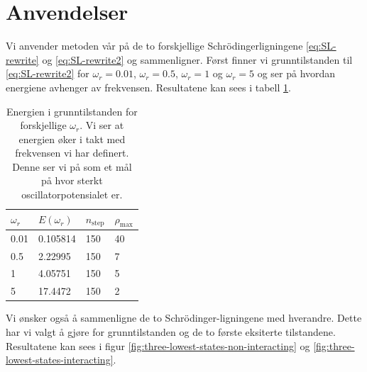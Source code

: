 \documentclass[11pt]{article}
\begin{document}
\section{Anvendelser}
Vi anvender metoden vår på de to forskjellige Schr\"odingerligningene \eqref{eq:SL-rewrite} og \eqref{eq:SL-rewrite2} og sammenligner.
Først finner vi grunntilstanden til \eqref{eq:SL-rewrite2} for $\omega_r = 0.01$, $\omega_r = 0.5$, $\omega_r = 1$ og $\omega_r = 5$ og
ser på hvordan energiene avhenger av frekvensen. Resultatene kan sees i tabell \ref{tab:1}.
\begin{table}[h]
\centering
\caption{Energien i grunntilstanden for forskjellige $\omega_r$. Vi ser at energien
øker i takt med frekvensen vi har definert. Denne ser vi på som et mål på hvor sterkt 
oscillatorpotensialet er.}
\label{tab:1}
\vspace{0.1cm}
\begin{tabular}{llll}
$\omega_r$ & $E(\omega_r)$ & $n_\text{step}$ & $\rho_\text{max}$\\  
\hline   %
0.01 & 0.105814 & 150 & 40  \\
0.5 & 2.22995 & 150 & 7  \\
1 & 4.05751  & 150 & 5\\
5 & 17.4472 & 150 & 2  \\
\end{tabular}
\end{table}


Vi ønsker også å sammenligne de to Schr\"odinger-ligningene med hverandre. Dette har vi valgt å gjøre for 
grunntilstanden og de to første eksiterte tilstandene. Resultatene kan
sees i figur \ref{fig:three-lowest-states-non-interacting} og \ref{fig:three-lowest-states-interacting}.
\end{document}
